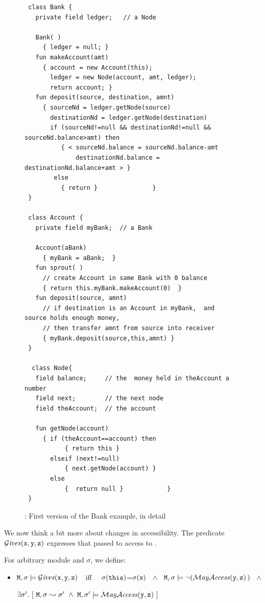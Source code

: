 \begin{figure}[tbp]
\begin{lstlisting}
 class Bank {
   private field ledger;   // a Node

   Bank( )
     { ledger = null; }
   fun makeAccount(amt)
     { account = new Account(this);
       ledger = new Node(account, amt, ledger);
       return account; }
   fun deposit(source, destination, amnt)
     { sourceNd = ledger.getNode(source)
       destinationNd = ledger.getNode(destination)
       if (sourceNd!=null && destinationNd!=null && sourceNd.balance>amt) then
          { < sourceNd.balance = sourceNd.balance-amt
              destinationNd.balance = destinationNd.balance+amt > }
        else
          { return }               }
 }

 class Account {
   private field myBank;  // a Bank

   Account(aBank)
     { myBank = aBank;  }
   fun sprout( )
     // create Account in same Bank with 0 balance
     { return this.myBank.makeAccount(0)  }
   fun deposit(source, amnt)
     // if destination is an Account in myBank,  and  source holds enough money,
     // then transfer amnt from source into receiver
     { myBank.deposit(source,this,amnt) }
 }

  class Node{
   field balance;     // the  money held in theAccount a number
   field next;        // the next node
   field theAccount;  // the account

   fun getNode(account)
     { if (theAccount==account) then
           { return this }
       elseif (next!=null)
           { next.getNode(account) }
       else
           {  return null }            }	
 }
\end{lstlisting}
\caption{\MOne: First version of the Bank example, in detail}
\label{fig:BankDetailedOne}
 \end{figure}


We now think a bit more about changes in accessibility. The predicate  $\mathcal{G}\textrm{\textit{ives}}({\mbox{\tt{x}}},{\mbox{\tt{y}}},{\mbox{\tt{z}}})$ expresses
that  passed to  access to .

\begin{definition}[Giving]
For arbitrary module \M and $\sigma$, we define:

\begin{itemize}
\item
${\mbox{\tt{M}}},\sigma  \models \mathcal{G}\textrm{\textit{ives}}({\mbox{\tt{x}}},{\mbox{\tt{y}}},{\mbox{\tt{z}}})$\ \ iff \ \
$\sigma({\mbox{\tt{this}}})$=$\sigma({\mbox{\tt{x}}})$ \  $\wedge$ \
${\mbox{\tt{M}}}, \sigma \models \neg (\mathcal{M}\textrm{\textit{ay}}{\mathcal{A}}\textrm{\textit{ccess}}( {\mbox{\tt{y}}},{\mbox{\tt{z}}})\,)$ \ $\wedge$ \\
\strut \hspace{.9cm} $\exists \sigma'. \ [\  {\mbox{\tt{M}}},\sigma \leadsto \sigma'  \  \wedge  \
 {\mbox{\tt{M}}},\sigma' \models \mathcal{M}\textrm{\textit{ay}}{\mathcal{A}}\textrm{\textit{ccess}}( {\mbox{\tt{y}}},{\mbox{\tt{z}}})\ ]$
\end{itemize}

\end{definition}


